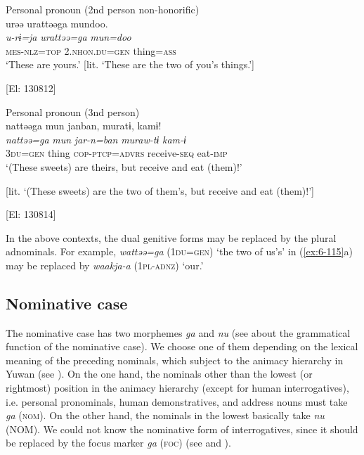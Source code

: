 \begin{table}
      [El: 130812]

\ex Personal pronoun (2nd person non-honorific)\\
{\TM}
\glll  urəə  urattəəga  mundoo.\\
\textit{u-rɨ=ja}  \textit{urattəə=ga}  \textit{mun=doo}\\
\textsc{mes}-\textsc{nlz}=\textsc{top}  2.\textsc{nhon}.\textsc{du}=\textsc{gen}  thing=\textsc{ass}\\
\glt ‘These are yours.’ [lit. ‘These are the two of you’s things.’]

      [El: 130812]

\ex Personal pronoun (3nd person)\\
{\TM}
\glll  nattəəga  mun  janban,  muratɨ,  kamɨ!\\
\textit{nattəə=ga}  \textit{mun}  \textit{jar-n=ban}  \textit{muraw-tɨ}  \textit{kam-ɨ}\\
3\textsc{du}=\textsc{gen}  thing  \textsc{cop}-\textsc{ptcp}=\textsc{advrs}  receive-\textsc{seq}  eat-\textsc{imp}\\
\glt ‘(These sweets) are theirs, but receive and eat (them)!’

[lit. ‘(These sweets) are the two of them’s, but receive and eat (them)!’]

      [El: 130814]

In the above contexts, the dual genitive forms may be replaced by the plural adnominals. For example, \textit{wattəə=ga} (1\textsc{du}=\textsc{gen}) ‘the two of us’s’ in (\ref{ex:6-115}a) may be replaced by \textit{waakja-a} (1\textsc{pl}-\textsc{adnz}) ‘our.’

\subsection{Nominative case}

The nominative case has two morphemes \textit{ga} and \textit{nu} (see  about the grammatical function of the nominative case). We choose one of them depending on the lexical meaning of the preceding nominals, which subject to the animacy hierarchy in Yuwan (see ). On the one hand, the nominals other than the lowest (or rightmost) position in the animacy hierarchy (except for human interrogatives), i.e. personal pronominals, human demonstratives, and address nouns must take \textit{ga} (\textsc{nom}). On the other hand, the nominals in the lowest basically take \textit{nu} (NOM). We could not know the nominative form of interrogatives, since it should be replaced by the focus marker \textit{ga} (\textsc{foc}) (see  and ).


\end{table}

